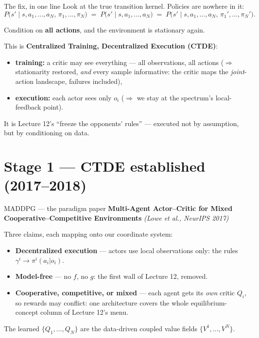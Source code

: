 \documentclass[10pt, aspectratio=169]{beamer}
\newcommand{\paper}[1]{\textcolor{mLightBrown}{\small\textit{(#1)}}}
\begin{document}
\begin{frame}{The fix, in one line}
Look at the true transition kernel. Policies are nowhere in it:
\[
P\big(s' \mid s, a_1,\dots,a_N,\, \pi_1,\dots,\pi_N\big) \;=\; P\big(s' \mid s, a_1,\dots,a_N\big) \;=\; P\big(s' \mid s, a_1,\dots,a_N,\, \pi_1',\dots,\pi_N'\big).
\]
\medskip
\begin{center}\large
\alert{Condition on \textbf{all actions}, and the environment is stationary again.}
\end{center}
\medskip

\pause
This is \textbf{Centralized Training, Decentralized Execution (CTDE)}:
\begin{itemize}\setlength\itemsep{2pt}
\item \textbf{training:} a critic may see everything --- all observations, all actions ($\Rightarrow$ stationarity restored, \emph{and} every sample informative: the critic maps the \emph{joint}-action landscape, failures included),
\item \textbf{execution:} each actor sees only $o_i$ ($\Rightarrow$ we stay at the spectrum's local-feedback point).
\end{itemize}
\medskip

\pause
It is Lecture 12's ``freeze the opponents' rules'' --- executed not by assumption, but \alert{by conditioning on data}.
\end{frame}

\section{Stage 1 --- CTDE established (2017--2018)}

\begin{frame}{MADDPG --- the paradigm paper}
\textbf{Multi-Agent Actor--Critic for Mixed Cooperative--Competitive Environments} \paper{Lowe et al., NeurIPS 2017}
\medskip

Three claims, each mapping onto our coordinate system:
\begin{itemize}\setlength\itemsep{3pt}
\item \textbf{Decentralized execution} --- actors use local observations only: the rules $\gamma^i \to \pi^i(a_i|o_i)$.
\item \textbf{Model-free} --- no $f$, no $g$: the first wall of Lecture 12, removed.
\item \textbf{Cooperative, competitive, or mixed} --- each agent gets its \emph{own} critic $Q_i$, so rewards may conflict: one architecture covers the whole \alert{equilibrium-concept column} of Lecture 12's menu.
\end{itemize}
\medskip
\pause
\begin{center}
\alert{The learned $\{Q_1,\dots,Q_N\}$ are the data-driven coupled value fields $\{V^1,\dots,V^N\}$.}
\end{center}
\end{frame}
\end{document}
